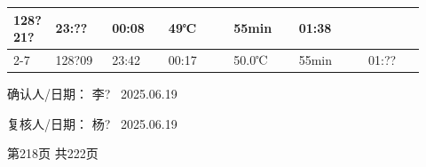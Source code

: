 \documentclass[UTF8,10pt,a4paper,fontset=fandol]{ctexart}
\newcommand{\fieldvalue}[1]{#1}
\newcommand{\handwritten}[1]{#1}
\begin{document}
\begin{tabular}{|p{0.07\linewidth}|p{0.13\linewidth}|p{0.13\linewidth}|p{0.15\linewidth}|p{0.15\linewidth}|p{0.16\linewidth}|p{0.13\linewidth}|}
\fieldvalue{\handwritten{128?21?}} &
\fieldvalue{\handwritten{23:??}} &
\fieldvalue{\handwritten{00:08}} &
\fieldvalue{\handwritten{49℃}} &
\fieldvalue{\handwritten{55min}} &
\fieldvalue{\handwritten{01:38}}
\\ \cline{2-7}
\multicolumn{1}{|p{0.07\linewidth}|}{} &
\fieldvalue{\handwritten{128?09}} &
\fieldvalue{\handwritten{23:42}} &
\fieldvalue{\handwritten{00:17}} &
\fieldvalue{\handwritten{50.0℃}} &
\fieldvalue{\handwritten{55min}} &
\fieldvalue{\handwritten{01:??}}
\\ \hline
\end{tabular}
\normalsize

\vspace{1em}

确认人/日期：
\fieldvalue{\handwritten{李? \ 2025.06.19}}

\hfill

复核人/日期：
\fieldvalue{\handwritten{杨? \ 2025.06.19}}

\vfill

\begin{center}
第218页 共222页
\end{center}
\end{document}
